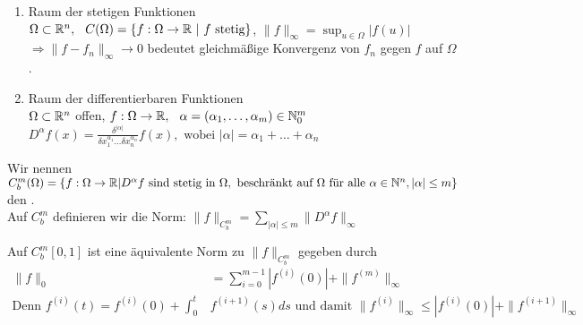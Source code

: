 \begin{beispiel}
	\begin{enumerate}[label=\alph*\upshape)]
		\item Raum der stetigen Funktionen  \\
		$\Omega \subset \mathbb{R}^{n}, \hspace{0.25cm} C(\Omega) = \{ f: \Omega \rightarrow \mathbb{R} \text{ | } f \text{ stetig} \}$, \hspace{0.25cm} $\| f \|_{\infty} = \sup_{u \in \Omega} |f(u)|$\\
		$\Rightarrow \| f - f_{n} \|_{\infty} \rightarrow 0$ bedeutet gleichmä{\ss}ige Konvergenz von $f_{n}$ gegen $f$ auf $\Omega$.
		\item Raum der differentierbaren Funktionen  \\
		$\Omega \subset \mathbb{R}^{n}$ offen, $f: \Omega \rightarrow \mathbb{R}, \hspace{0.25cm} \alpha = (\alpha_{1}, \dotsc, \alpha_{m}) \in \mathbb{N}_{0}^{m}$ \\
		$D^{\alpha}f(x) = \frac{ \delta^{ | \alpha | } }{ \delta x_{1}^{ \alpha_{1} } \dotsc \delta x_{n}^{ \alpha_{n} } } f(x), \text{ wobei } | \alpha | = \alpha_{1} + \dotsc + \alpha_{n} $ \\ 
	\end{enumerate}
\end{beispiel}

\begin{definition}
Wir nennen $C_{b}^{m}(\Omega) = \{ f: \Omega \rightarrow \mathbb{R} | D^{\alpha}f \text{ sind stetig in } \Omega, \text{ beschränkt auf } \Omega \text{ für alle } \alpha \in \mathbb{N}^{n}, |\alpha| \leq m \}$ den .  \\
Auf $C_{b}^{m}$ definieren wir die Norm: $\| f \|_{C_{b}^{m}} = \sum_{|\alpha| \leq m} \| D^{\alpha}f \|_{\infty}$
\end{definition}

\begin{bemerkung}
Auf $C_{b}^{m} [0, 1]$ ist eine äquivalente Norm zu  $\| f \|_{C_{b}^{m}}$ gegeben durch
\begin{align*}
	\| f \|_{0} & = \sum_{i = 0}^{m - 1} |f^{(i)}(0)| + \| f^{(m)} \|_{\infty} \\
	\text{Denn } f^{(i)}(t) = f^{(i)}(0) + \int_{0}^{t} & f^{(i + 1)}(s) ds \text{ und damit } \| f^{(i)}\|_{\infty} \leq | f^{(i)}(0) | + \| f^{(i + 1)}\|_{\infty}	
\end{align*}
\end{bemerkung}

